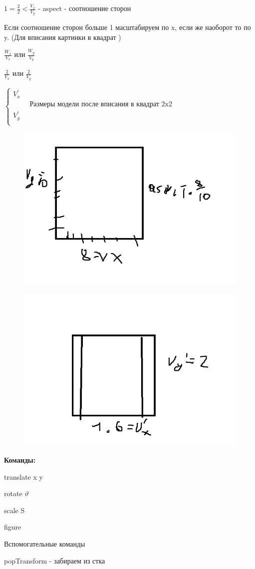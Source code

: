 \documentclass{article}
\begin{document}
$1 = \frac{2}{2} < \frac{V_x}{V_y}$ - aspect - соотношение сторон

Если соотношение сторон больше 1 масштабируем по x, если же наоборот то по y.
 (Для вписания картинки в квадрат )

$\frac{W_x}{V_x}$ или $\frac{W_y}{V_y}$


$\frac{2}{V_x}$ или $\frac{2}{V_y}$




$ \begin{cases}
 V_{x}^{'} \\  
\hspace{1cm} \text{Размеры модели после вписания в квадрат 2x2} \\
V_{y}^{'} \\
\end{cases} $


\begin{figure} [H]
    \includegraphics[width=0.50\linewidth]{1.png}
\end{figure}

\begin{figure} [H]
    \includegraphics[width=0.50\linewidth]{2.png}
\end{figure}

\textbf{Команды:}

translate x  y


rotate $\vartheta$


scale S


figure 

Вспомогательные команды

popTransform - забираем из стка
\end{document}
